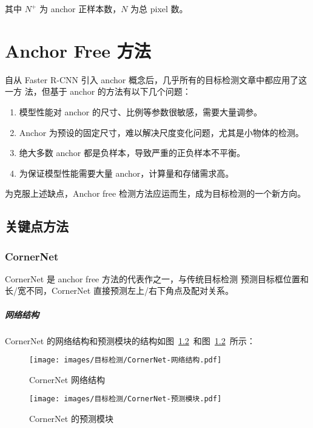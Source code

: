 其中 $N^+$ 为 anchor 正样本数，$N$ 为总 pixel 数。

\chapter{Anchor Free 方法}
自从 Faster R-CNN 引入 anchor 概念后，几乎所有的目标检测文章中都应用了这一方
法，但基于 anchor 的方法有以下几个问题：

\begin{enumerate}
  \item 模型性能对 anchor 的尺寸、比例等参数很敏感，需要大量调参。
  \item Anchor 为预设的固定尺寸，难以解决尺度变化问题，尤其是小物体的检测。
  \item 绝大多数 anchor 都是负样本，导致严重的正负样本不平衡。
  \item 为保证模型性能需要大量 anchor，计算量和存储需求高。
\end{enumerate}

为克服上述缺点，Anchor free 检测方法应运而生，成为目标检测的一个新方向。

\section{关键点方法}

\subsection{CornerNet}
\label{sec:CornerNet}
CornerNet\cite{2018-CornerNet} 是 anchor free 方法的代表作之一，与传统目标检测
预测目标框位置和长/宽不同，CornerNet 直接预测左上/右下角点及配对关系。

\paragraph{网络结构}
CornerNet 的网络结构和预测模块的结构如图~\ref{fig:CornerNet-network}~和图~\ref{fig:CornerNet-network}~所示：

\begin{figure}[ht]
  \centering
  \texttt{[image: images/目标检测/CornerNet-网络结构.pdf]}
  \caption{CornerNet 网络结构}
  \label{fig:CornerNet-network}
\end{figure}

\begin{figure}[ht]
  \centering
  \texttt{[image: images/目标检测/CornerNet-预测模块.pdf]}
  \caption{CornerNet 的预测模块}
  \label{fig:CornerNet-network}
\end{figure}

